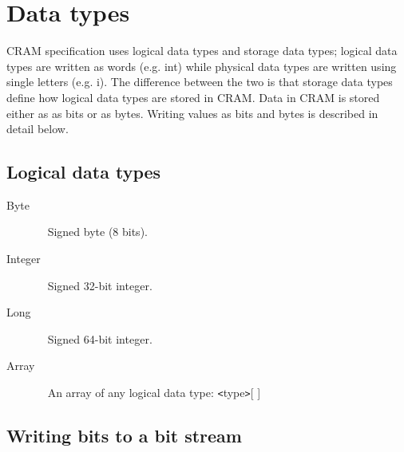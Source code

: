 \documentclass[a4paper]{article}
\begin{document}
\section{\textbf{Data types}}

CRAM specification uses logical data types and storage data types; logical data 
types are written as words (e.g. int) while physical data types are written using 
single letters (e.g. i). The difference between the two is that storage data types 
define how logical data types are stored in CRAM. Data in CRAM is stored either 
as as bits or as bytes. Writing values as bits and bytes is described in detail 
below.

\subsection{\textbf{Logical data types}}

\begin{description}
\item[Byte]\ \newline
Signed byte (8 bits).

\item[Integer]\ \newline
Signed 32-bit integer. 

\item[Long]\ \newline
Signed 64-bit integer. 

\item[Array]\ \newline
An array of any logical data type: \texttt{<}type\texttt{>}[ ] 
\end{description}


\subsection{\textbf{Writing bits to a bit stream}}
\end{document}
